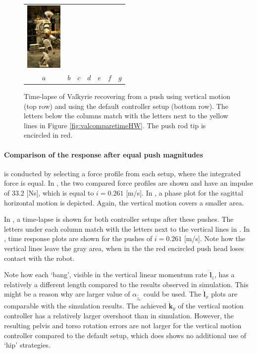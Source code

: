 \begin{figure}[h]
\begin{tabular}{ccccccc}
    \includegraphics[width=0.7in]{STYLESTUFF/val7d_30} \\
    $a$&
    $b$&
    $c$&
    $d$&
    $e$&
    $f$&
    $g$\\
  \end{tabular}
  \caption{Time-lapse of Valkyrie recovering from a push using vertical motion (top row) and using the default controller setup (bottom row). The letters below the columns match with the letters next to the yellow lines in Figure \ref{fig:valcomparetimeHW}. The push rod tip is encircled in red.}
  \label{fig:val}
\end{figure}

\paragraph{Comparison of the response after equal push magnitudes} is conducted by selecting a force profile from each setup, where the integrated force is equal. In , the two compared force profiles are shown and have an impulse of $33.2$ [Ns], which is equal to $i=0.261$ [m/s]. In , a phase plot for the sagittal horizontal motion is depicted. Again, the vertical motion covers a smaller area. 

In , a time-lapse is shown for both controller setups after these pushes. The letters under each column match with the letters next to the vertical lines in . In , time response plots are shown for the pushes of $i=0.261$ [m/s]. Note how the vertical lines leave the gray area, when in the  the red encircled push head loses contact with the robot. 

Note how each `bang', visible in the vertical linear momentum rate $\dot{\mathbf{l}}_z$, has a relatively a different length compared to the results observed in simulation. This might be a reason why are larger value of $\alpha_{\hat{\ddot{z}}_{c}}$ could be used. The $\dot{\mathbf{l}}_x$ plots are comparable with the simulation results. The achieved $\dot{\mathbf{k}}_y$ of the vertical motion controller has a relatively larger overshoot than in simulation. However, the resulting pelvis and torso rotation errors are not larger for the vertical motion controller compared to the default setup, which does shows no additional use of `hip' strategies. 


